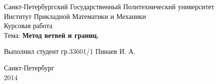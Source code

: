 ﻿\begin{center}{
\normalsize Санкт-Петербургский Государственный Политехнический университет\\
Институт Прикладной Математики и Механики\\
[7cm]
} 
\huge Курсовая работа \\
\large	
Тема: \textbf{Метод ветвей и границ.} \\
[7cm]
\begin{flushleft}
Выполнил студент гр.33601/1 \hspace{6 cm} Пинаев И. А.\\
\end{flushleft}
\vfill
{\large Санкт-Петербург \\ 2014} 
\end{center}
\thispagestyle{empty}

